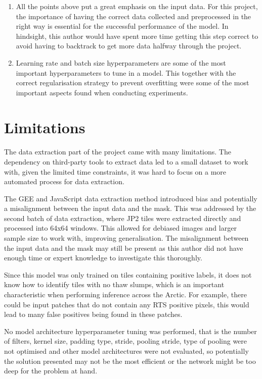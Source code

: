 \begin{enumerate}
    \item{All the points above put a great emphasis on the input data. For this project, the importance of having the correct data collected and preprocessed in the right way is essential for the successful performance of the model. In hindsight, this author would have spent more time getting this step correct to avoid having to backtrack to get more data halfway through the project.}
    \item{Learning rate and batch size hyperparameters are some of the most important hyperparameters to tune in a model. This together with the correct regularisation strategy to prevent overfitting were some of the most important aspects found when conducting experiments.}
\end{enumerate}

\section{Limitations}
\paragraph{}
The data extraction part of the project came with many limitations. The dependency on third-party tools to extract data led to a small dataset to work with, given the limited time constraints, it was hard to focus on a more automated process for data extraction.

The \gls{GEE} and JavaScript data extraction method introduced bias and potentially a misalignment between the input data and the mask. This was addressed by the second batch of data extraction, where \gls{JP2} tiles were extracted directly and processed into 64x64 windows. This allowed for debiased images and larger sample size to work with, improving generalisation. The misalignment between the input data and the mask may still be present as this author did not have enough time or expert knowledge to investigate this thoroughly.

Since this model was only trained on tiles containing positive labels, it does not know how to identify tiles with no thaw slumps, which is an important characteristic when performing inference across the Arctic. For example, there could be input patches that do not contain any \gls{RTS} positive pixels, this would lead to many false positives being found in these patches.

No model architecture hyperparameter tuning was performed, that is the number of filters, kernel size, padding type, stride, pooling stride, type of pooling were not optimised and other model architectures were not evaluated, so potentially the solution presented may not be the most efficient or the network might be too deep for the problem at hand.

